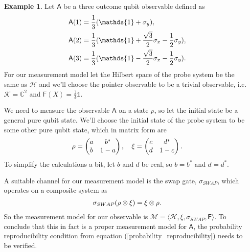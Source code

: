 \documentclass[a4paper,12pt]{wihuri}
\theoremstyle{definition}
\newtheorem{example}{Example}
\numberwithin{definition}{section}
\numberwithin{example}{section}
\numberwithin{theorem}{section}
\numberwithin{proposition}{section}
\numberwithin{lemma}{section}
\newcommand{\hi}{\mathcal{H}}%
\newcommand{\ki}{\mathcal{K}}%
\newcommand{\mm}{\mathcal{M}}%
\newcommand{\A}{\mathsf{A}}%
\newcommand{\F}{\mathsf{F}}%
\newcommand{\id}{\mathds{1}}
\newcommand{\cc}{\mathbb{C}^2}%
\begin{document}
\begin{example}
Let $\A$ be a three outcome qubit observable defined as
\begin{align*}
\A(1) &= \dfrac{1}{3}(\id + \sigma_y),\\
\A(2) &= \dfrac{1}{3}(\id + \dfrac{\sqrt{3}}{2}\sigma_x - \dfrac{1}{2}\sigma_y),\\
\A(3) &= \dfrac{1}{3}(\id - \dfrac{\sqrt{3}}{2}\sigma_x - \dfrac{1}{2}\sigma_y)\text.
\end{align*}
For our measurement model let the Hilbert space of the probe system be the same as $\hi$ and we'll choose the pointer observable to be a trivial observable, i.e. $\ki = \cc$ and $\F(X) = \frac{1}{3}\id$.

We need to measure the observable $\A$ on a state $\rho$, so let the initial state be a general pure qubit state. We'll choose the initial state of the probe system to be some other pure qubit state, which in matrix form are
\begin{align*}
\rho = \begin{pmatrix}
a & b^* \\
b & 1-a
\end{pmatrix},\quad \xi = \begin{pmatrix}
c & d^* \\
d & 1-c
\end{pmatrix}\text.
\end{align*}
To simplify the calculations a bit, let $b$ and $d$ be real, so $b = b^*$ and $d = d^*$.

A suitable channel for our measurement model is the swap gate, $\sigma_{SWAP}$, which operates on a composite system as
\begin{align*}
\sigma_{SWAP}(\rho \otimes \xi) = \xi \otimes \rho \text.
\end{align*} 
So the measurement model for our observable is $\mm = \langle \hi, \xi, \sigma_{SWAP}, \F \rangle$. To conclude that this in fact is a proper measurement model for $\A$, the probability reproducibility condition from equation (\ref{probability_reproducibility}) needs to be verified. 


\end{example}
\end{document}
